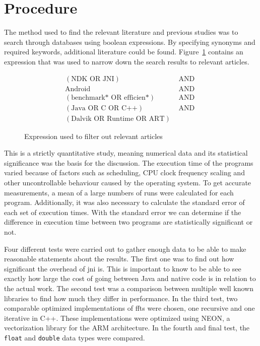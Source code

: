\section{Procedure}

The method used to find the relevant literature and previous studies was to search through databases using boolean expressions. By specifying synonyms and required keywords, additional literature could be found. Figure~\ref{fig:db:search} contains an expression that was used to narrow down the search results to relevant articles.

\ifrelease
\begin{figure}[H]
    \centering
    \begin{align*}
        (\text{NDK OR JNI})               & \text{ AND } \\
        \text{Android}                    & \text{ AND } \\
        (\text{benchmark* OR efficien*})  & \text{ AND } \\
        (\text{Java OR C OR C++})         & \text{ AND } \\
        (\text{Dalvik OR Runtime OR ART}) &
    \end{align*}
    \caption{Expression used to filter out relevant articles}
    \label{fig:db:search}
\end{figure}
\fi

This is a strictly quantitative study, meaning numerical data and its statistical significance was the basis for the discussion. The execution time of the programs varied because of factors such as scheduling, CPU clock frequency scaling and other uncontrollable behaviour caused by the operating system. To get accurate measurements, a mean of a large numbers of runs were calculated for each program. Additionally, it was also necessary to calculate the standard error of each set of execution times. With the standard error we can determine if the difference in execution time between two programs are statistically significant or not.

Four different tests were carried out to gather enough data to be able to make reasonable statements about the results. The first one was to find out how significant the overhead of \gls{jni} is. This is important to know to be able to see exactly how large the cost of going between Java and native code is in relation to the actual work. The second test was a comparison between multiple well known libraries to find how much they differ in performance. In the third test, two comparable optimized implementations of \gls{fft}s were chosen, one recursive and one iterative in C++. These implementations were optimized using NEON, a vectorization library for the ARM architecture. In the fourth and final test, the \texttt{float} and \texttt{double} data types were compared.


